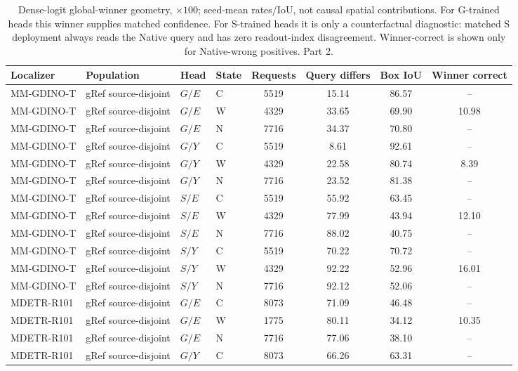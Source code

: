 \begin{table}[t]
\centering\footnotesize
\setlength{\tabcolsep}{3pt}
\renewcommand{\arraystretch}{1.15}
\caption{Dense-logit global-winner geometry, $\times100$; seed-mean rates/IoU, not causal spatial contributions. For G-trained heads this winner supplies matched confidence. For S-trained heads it is only a counterfactual diagnostic: matched S deployment always reads the Native query and has zero readout-index disagreement. Winner-correct is shown only for Native-wrong positives. Part 2.}\label{tab:supp_v6_winner_geometry_2}
\begin{tabular}{@{}llllcccc@{}}\toprule
Localizer & Population & Head & State & Requests & Query differs & Box IoU & Winner correct\\\midrule
MM-GDINO-T & gRef source-disjoint & $G/E$ & C & 5519 & 15.14 & 86.57 & --\\
MM-GDINO-T & gRef source-disjoint & $G/E$ & W & 4329 & 33.65 & 69.90 & 10.98\\
MM-GDINO-T & gRef source-disjoint & $G/E$ & N & 7716 & 34.37 & 70.80 & --\\
MM-GDINO-T & gRef source-disjoint & $G/Y$ & C & 5519 & 8.61 & 92.61 & --\\
MM-GDINO-T & gRef source-disjoint & $G/Y$ & W & 4329 & 22.58 & 80.74 & 8.39\\
MM-GDINO-T & gRef source-disjoint & $G/Y$ & N & 7716 & 23.52 & 81.38 & --\\
MM-GDINO-T & gRef source-disjoint & $S/E$ & C & 5519 & 55.92 & 63.45 & --\\
MM-GDINO-T & gRef source-disjoint & $S/E$ & W & 4329 & 77.99 & 43.94 & 12.10\\
MM-GDINO-T & gRef source-disjoint & $S/E$ & N & 7716 & 88.02 & 40.75 & --\\
MM-GDINO-T & gRef source-disjoint & $S/Y$ & C & 5519 & 70.22 & 70.72 & --\\
MM-GDINO-T & gRef source-disjoint & $S/Y$ & W & 4329 & 92.22 & 52.96 & 16.01\\
MM-GDINO-T & gRef source-disjoint & $S/Y$ & N & 7716 & 92.12 & 52.06 & --\\
MDETR-R101 & gRef source-disjoint & $G/E$ & C & 8073 & 71.09 & 46.48 & --\\
MDETR-R101 & gRef source-disjoint & $G/E$ & W & 1775 & 80.11 & 34.12 & 10.35\\
MDETR-R101 & gRef source-disjoint & $G/E$ & N & 7716 & 77.06 & 38.10 & --\\
MDETR-R101 & gRef source-disjoint & $G/Y$ & C & 8073 & 66.26 & 63.31 & --\\

\end{tabular}
\end{table}
